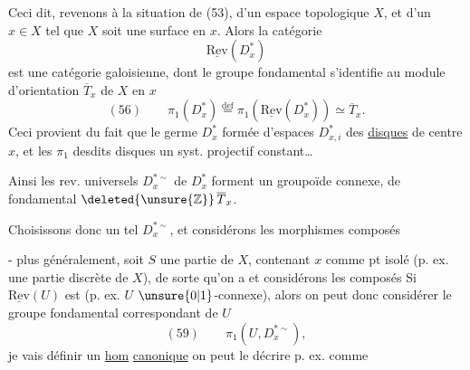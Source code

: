 
Ceci dit, revenons à la situation de (53), d'un espace topologique $X$, et d'un $x\in X$ tel que $X$ soit une surface en $x$. Alors la catégorie 
\[
\underline{\mathrm{Rev}}(D_x^*)
\]
est une catégorie galoisienne,  dont le groupe fondamental s'identifie  au module d'orientation $\overline T_x$ de $X$ en $x$
\[
(56)\qquad \pi_1(D_x^*)\overset{\mathrm{def}}=\pi_1(\underline{\mathrm{Rev}}(D_x^*))\simeq\overline T_x.
\]
Ceci provient du fait que le germe $D_x^*$   formée d'espaces $D_{x,i}^*$   des \uline{disques} de centre $x$, et les $\pi_1$ desdits disques  un syst. projectif constant\ldots

Ainsi les rev. universels $D_x^{*\sim}$ de $D_x^*$ forment un groupoïde connexe, de  fondamental $\deleted{\unsure{\mathbb{Z}}}\,\overline T_x$.

Choisissons donc un tel $D_x^{*\sim}$, et considérons les morphismes composés

- plus généralement, soit $S$ une partie de $X$, contenant $x$ comme pt isolé (p. ex. une partie discrète de $X$), de sorte qu'on a
et considérons les composés
Si $\underline{\mathrm{Rev}}(U)$ est  (p. ex. $U$  $\unsure{0|1}$-connexe), alors on peut donc considérer le groupe fondamental correspondant de $U$
\[
(59)\qquad \pi_1(U,D_x^{*\sim}),
\]
je vais définir un \uline{hom} \uline{canonique}
on peut le décrire p. ex. comme

